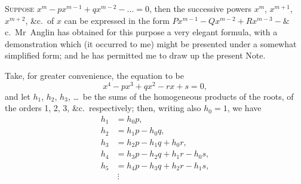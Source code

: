 \documentclass[11pt,a4paper]{book}
\begin{document}
\bigskip

\noindent
\textsc{Suppose} $x^m - px^{m-1} + qx^{m-2} - \ldots = 0$, then the successive powers $x^m$, $x^{m+1}$, $x^{m+2}$, \&c.\ of $x$ can be expressed in the form $Px^{m-1} - Qx^{m-2} + Rx^{m-3} - \&$c.\ Mr~Anglin has obtained for this purpose a very elegant formula, with a demonstration which (it occurred to me) might be presented under a somewhat simplified form; and he has permitted me to draw up the present Note.

Take, for greater convenience, the equation to be
\[
x^4 - px^3 + qx^2 - rx + s = 0,
\]
and let $h_1$, $h_2$, $h_3$, \ldots\ be the sums of the homogeneous products of the roots, of the orders 1, 2, 3, \&c.\ respectively; then, writing also $h_0 = 1$, we have
\begin{align*}
h_1 &= h_0 p, \\
h_2 &= h_1 p - h_0 q, \\
h_3 &= h_2 p - h_1 q + h_0 r, \\
h_4 &= h_3 p - h_2 q + h_1 r - h_0 s, \\
h_5 &= h_4 p - h_3 q + h_2 r - h_1 s,\\
&\ \vdots
\end{align*}
\end{document}

